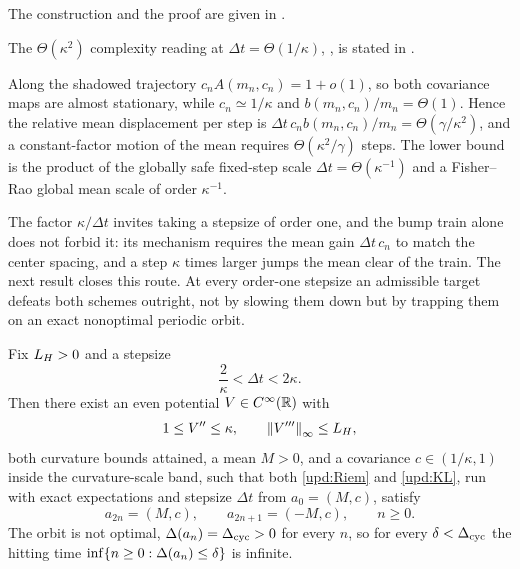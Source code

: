 The construction and the proof are given in .

The $\Theta(\kappa^2)$ complexity reading at $\Delta t=\Theta(1/\kappa)$,
, is stated in .

Along the shadowed trajectory $c_nA(m_n,c_n)=1+o(1)$, so both covariance maps are almost
stationary, while $c_n\simeq1/\kappa$ and $b(m_n,c_n)/m_n=\Theta(1)$. Hence the relative
mean displacement per step is
$\Delta t\,c_nb(m_n,c_n)/m_n=\Theta(\gamma/\kappa^2)$, and a constant-factor motion of the
mean requires $\Theta(\kappa^2/\gamma)$ steps. The lower bound is the product of the
globally safe fixed-step scale $\Delta t=\Theta(\kappa^{-1})$ and a Fisher--Rao global mean
scale of order $\kappa^{-1}$.

The factor $\kappa/\Delta t$ invites taking a stepsize of order one, and the bump train
alone does not forbid it: its mechanism requires the mean gain $\Delta t\,c_n$ to match the
center spacing, and a step $\kappa$ times larger jumps the mean clear of the train. The next
result closes this route. At every order-one stepsize an admissible target defeats both
schemes outright, not by slowing them down but by trapping them on an exact nonoptimal
periodic orbit.

\begin{theorem}\label{thm:two-cycle}
    Fix $L_H>0$ and a stepsize
    \begin{equation*}
        \frac2\kappa<\Delta t<2\kappa .
    \end{equation*}
    Then there exist an even potential $V\in C^\infty(\mathbb{R})$ with
    \begin{equation*}
        1\leq V''\leq\kappa,
        \qquad
        \left\lVert V'''\right\rVert_\infty\leq L_H,
    \end{equation*}
    both curvature bounds attained, a mean $M>0$, and a covariance $c\in(1/\kappa,1)$ inside
    the curvature-scale band, such that both \eqref{upd:Riem} and \eqref{upd:KL}, run with
    exact expectations and stepsize $\Delta t$ from $a_0=(M,c)$, satisfy
    \begin{equation*}
        a_{2n}=(M,c),
        \qquad
        a_{2n+1}=(-M,c),
        \qquad
        n\geq0 .
    \end{equation*}
    The orbit is not optimal, $\Delta(a_n)=\Delta_{\mathrm{cyc}}>0$ for every $n$, so for
    every $\delta<\Delta_{\mathrm{cyc}}$ the hitting time
    $\inf\{n\geq0:\Delta(a_n)\leq\delta\}$ is infinite.
\end{theorem}

